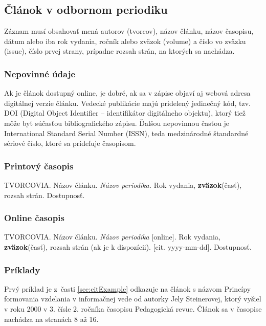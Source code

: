 \documentclass[../../../thesis.tex]{subfiles}
\begin{document}
\subsection{Článok v odbornom periodiku}
Záznam musí obsahovať mená autorov (tvorcov), názov článku, názov časopisu, dátum alebo iba rok vydania, ročník alebo zväzok (volume) a číslo vo zväzku (issue), číslo prvej strany, prípadne rozsah strán, na ktorých sa nachádza.

\subsubsection*{\normalsize Nepovinné údaje}
Ak je článok dostupný online, je dobré, ak sa v zápise objaví aj webová adresa digitálnej verzie článku. Vedecké publikácie majú pridelený jedinečný kód, tzv. DOI (Digital Object Identifier – identifikátor digitálneho objektu), ktorý tiež môže byť súčasťou bibliografického zápisu. Ďalšou nepovinnou časťou je International Standard Serial Number (ISSN), teda medzinárodné štandardné sériové číslo, ktoré sa prideľuje časopisom.

\subsubsection*{\normalsize Printový časopis}
\begin{trivlist}
\item TVORCOVIA. Názov článku. \textit{Názov periodika.} Rok vydania, \textbf{zväzok}(časť), rozsah strán. Dostupnosť.
\end{trivlist}

\subsubsection*{\normalsize Online časopis}
\begin{trivlist}
\item TVORCOVIA. Názov článku. \textit{Názov periodika} [online]. Rok vydania, \textbf{zväzok}(časť), rozsah strán (ak je k dispozícii). [cit. yyyy-mm-dd]. Dostupnosť.
\end{trivlist}

\subsubsection*{\normalsize Príklady}
Prvý príklad je z~časti
\ref{sec:citExample} odkazuje na článok s názvom Princípy formovania vzdelania v informačnej vede od autorky Jely Steinerovej, ktorý vyšiel v roku 2000 v 3. čísle 2. ročníka časopisu Pedagogická revue. Článok sa v časopise nachádza na stranách 8 až 16.
\end{document}
